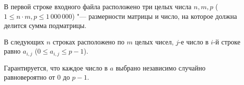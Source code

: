 В первой строке входного файла расположено три целых числа $n, m, p$ ($1 \leq n \cdot m, p \leq 1\,000\,000$) "--- размерности матрицы и число, на которое должна делится сумма подматрицы.

В следующих $n$ строках расположено по $m$ целых чисел, $j$-е число в $i$-й строке равно $a_{i, j}$ ($0 \leq a_{i, j} \leq p - 1$).


Гарантируется, что каждое число в $a$ выбрано независимо случайно равновероятно от $0$ до $p-1$.